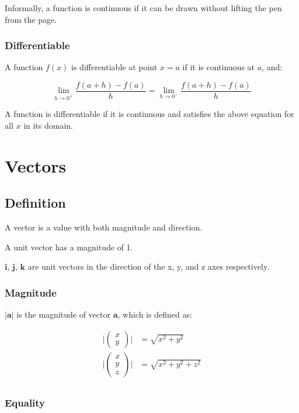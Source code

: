 \documentclass[a4paper,11pt]{report}
\newcommand{\bb}{\boldsymbol}
\begin{document}
Informally, a function is continuous if it can be drawn without lifting the pen
from the page.

\subsection{Differentiable}

A function $f(x)$ is differentiable at point $x = a$ if it is continuous at $a$,
and:

$$
\lim_{h \to 0^+} \frac{f(a + h) - f(a)}{h} = \lim_{h \to 0^-} \frac{f(a + h) - f(a)}{h}
$$

A function is differentiable if it is continuous and satisfies the above
equation for all $x$ in its domain.




\chapter{Vectors}

\section{Definition}

A vector is a value with both magnitude and direction.

A unit vector has a magnitude of 1.

$\bb{i}$, $\bb{j}$, $\bb{k}$ are unit vectors in the direction of the x, y, and z axes respectively.

\subsection{Magnitude}

$|\bb{a}|$ is the magnitude of vector $\bb{a}$, which is defined as:

$$
\begin{aligned}
\lvert \begin{pmatrix} x \\ y \end{pmatrix} \rvert & = \sqrt{x^2 + y^2} \\
\lvert \begin{pmatrix} x \\ y \\ z \end{pmatrix} \rvert & = \sqrt{x^2 + y^2 + z^2} \\
\end{aligned}
$$

\subsection{Equality}
\end{document}
